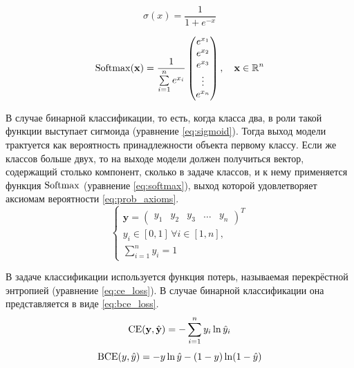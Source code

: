 \begin{equation}
    \label{eq:sigmoid}
    \sigma(x)=\frac{1}{1+e^{-x}}
\end{equation}

\begin{equation}
    \label{eq:softmax}
    \operatorname{Softmax}(\mathbf{x})=\frac{1}{\sum\limits_{i=1}^n e^{x_i}}
    \left(\begin{matrix}
        e^{x_1} \\
        e^{x_2} \\
        e^{x_3} \\
        \vdots \\
        e^{x_n}
    \end{matrix}\right),\quad \mathbf{x}\in \operatorname{\mathbb{R}}^n
\end{equation}

В случае бинарной классификации, то есть, когда класса два, в роли такой функции выступает сигмоида (уравнение \ref*{eq:sigmoid}). Тогда выход модели трактуется как вероятность принадлежности объекта первому классу. Если же классов больше двух, то на выходе модели должен получиться вектор, содержащий столько компонент, сколько в задаче классов, и к нему применяется функция $\operatorname{Softmax}$ (уравнение \ref*{eq:softmax}), выход которой удовлетворяет аксиомам вероятности \ref*{eq:prob_axioms}.
\begin{equation}
    \label{eq:prob_axioms}
    \begin{cases}
        \mathbf{y}=\left(\begin{matrix}
            y_1 & y_2 & y_3 & \dots & y_n
        \end{matrix}\right)^T \\
        y_i \in [0, 1]\,\forall i\in[1, n], \\
        \sum\limits_{i=1}^n y_i = 1
    \end{cases}
\end{equation}

В задаче классификации используется функция потерь, называемая перекрёстной энтропией (уравнение \ref*{eq:ce_loss}). В случае бинарной классификации она представляется в виде \ref*{eq:bce_loss}.
\begin{equation}
    \label{eq:ce_loss}
    \operatorname{CE}(\mathbf{y},\hat{\mathbf{y}})=-\sum\limits_{i=1}^n y_i \ln \hat{y}_i
\end{equation}
\begin{equation}
    \label{eq:bce_loss}
    \operatorname{BCE}(y,\hat{y})=-y \ln \hat{y} - (1-y)\ln (1-\hat{y})
\end{equation}

